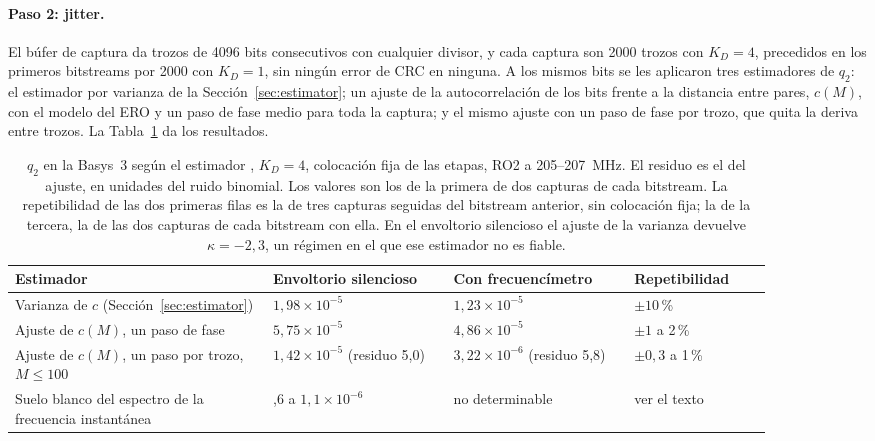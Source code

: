 \paragraph{Paso 2: jitter.} El búfer de captura da trozos de 4096 bits
consecutivos con cualquier divisor, y cada captura son 2000 trozos con
$K_D = 4$, precedidos en los primeros bitstreams por 2000 con $K_D = 1$,
sin ningún error de CRC en ninguna. A los mismos bits se les aplicaron
tres estimadores de $q_2$: el estimador por varianza de la
Sección~\ref{sec:estimator}; un ajuste de la autocorrelación de los bits
frente a la distancia entre pares, $c(M)$, con el modelo del \ac{ERO} y
un paso de fase medio para toda la captura; y el mismo ajuste con un paso
de fase por trozo, que quita la deriva entre trozos. La
Tabla~\ref{tab:fpga_q} da los resultados.

\begin{table}[htbp]
\centering
\caption{$q_2$ en la Basys~3 según el estimador \meas{}, $K_D = 4$,
colocación fija de las etapas, RO2 a 205--207~MHz. El residuo es el del
ajuste, en unidades del ruido binomial. Los valores son los de la
primera de dos capturas de cada bitstream. La repetibilidad de las dos
primeras filas es la de tres capturas seguidas del bitstream anterior,
sin colocación fija; la de la tercera, la de las dos capturas de cada
bitstream con ella. En el envoltorio silencioso el ajuste de la varianza
devuelve $\kappa = -2{,}3$, un régimen en el que ese estimador no es
fiable.}
\label{tab:fpga_q}
\small
\begin{tabular}{@{}>{\raggedright\arraybackslash}p{0.30\linewidth}>{\raggedright\arraybackslash}p{0.21\linewidth}>{\raggedright\arraybackslash}p{0.21\linewidth}>{\raggedright\arraybackslash}p{0.16\linewidth}@{}}
\toprule
Estimador & Envoltorio silencioso & Con frecuencímetro & Repetibilidad \\
\midrule
Varianza de $c$ (Sección~\ref{sec:estimator}) & $1{,}98\times10^{-5}$ & $1{,}23\times10^{-5}$ & $\pm10$\,\% \\
Ajuste de $c(M)$, un paso de fase & $5{,}75\times10^{-5}$ & $4{,}86\times10^{-5}$ & $\pm1$ a 2\,\% \\
Ajuste de $c(M)$, un paso por trozo, $M \le 100$ & $1{,}42\times10^{-5}$ (residuo 5,0) & $3{,}22\times10^{-6}$ (residuo 5,8) & $\pm0{,}3$ a 1\,\% \\
Suelo blanco del espectro de la frecuencia instantánea & 0,6 a $1{,}1\times10^{-6}$ & no determinable & ver el texto \\
\bottomrule
\end{tabular}
\end{table}

